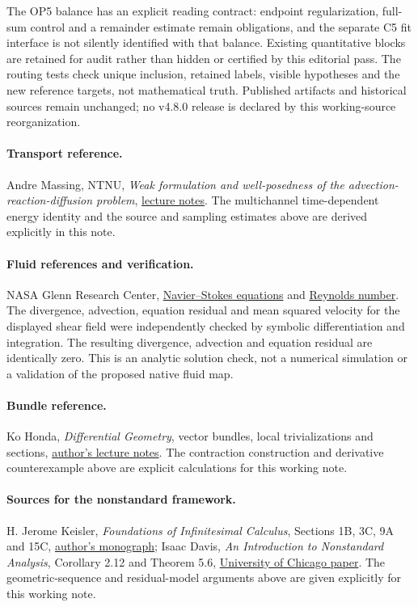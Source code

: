 \documentclass[11pt,a4paper]{article}
\begin{document}
The OP5 balance has an explicit reading contract: endpoint
regularization, full-sum control and a remainder estimate remain
obligations, and the separate C5 fit interface is not silently
identified with that balance. Existing quantitative blocks are
retained for audit rather than hidden or certified by this editorial
pass. The routing tests check unique inclusion, retained labels,
visible hypotheses and the new reference targets, not mathematical
truth. Published artifacts and historical sources remain unchanged;
no v4.8.0 release is declared by this working-source reorganization.

\paragraph{Transport reference.}
Andre Massing, NTNU, \emph{Weak formulation and well-posedness of the
advection-reaction-diffusion problem},
\href{https://www.math.ntnu.no/emner/MA8502/2024h/lectures/html/chapter_03/weak_form_adr.html}{lecture notes}.
The multichannel time-dependent energy identity and the source and sampling
estimates above are derived explicitly in this note.

\paragraph{Fluid references and verification.}
NASA Glenn Research Center,
\href{https://www1.grc.nasa.gov/beginners-guide-to-aeronautics/navier-strokes-equation/}{Navier--Stokes equations}
and
\href{https://www.grc.nasa.gov/WWW/K-12/airplane/reynolds.html}{Reynolds number}.
The divergence, advection, equation residual and mean squared velocity for
the displayed shear field were independently checked by symbolic
differentiation and integration. The resulting divergence, advection and
equation residual are identically zero. This is an analytic solution check,
not a numerical simulation or a validation of the proposed native fluid map.

\paragraph{Bundle reference.}
Ko Honda, \emph{Differential Geometry}, vector bundles, local trivializations
and sections,
\href{https://www.math.ucla.edu/~honda/math535a/notes.pdf}{author's lecture notes}.
The contraction construction and derivative counterexample above are
explicit calculations for this working note.

\paragraph{Sources for the nonstandard framework.}
H. Jerome Keisler, \emph{Foundations of Infinitesimal Calculus},
Sections 1B, 3C, 9A and 15C,
\href{https://people.math.wisc.edu/~hkeisler/foundations.pdf}{author's monograph};
Isaac Davis, \emph{An Introduction to Nonstandard Analysis},
Corollary 2.12 and Theorem 5.6,
\href{https://www.math.uchicago.edu/~may/VIGRE/VIGRE2009/REUPapers/Davis.pdf}{University of Chicago paper}.
The geometric-sequence and residual-model arguments above are given explicitly
for this working note.
\end{document}

